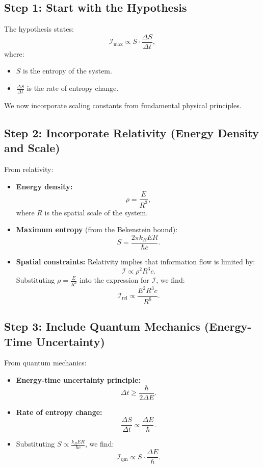 \documentclass[12pt]{article}
\begin{document}
\subsection{Step 1: Start with the Hypothesis}

The hypothesis states:
\[
\mathcal{I}_{\text{max}} \propto S \cdot \frac{\Delta S}{\Delta t},
\]
where:
\begin{itemize}
    \item $S$ is the entropy of the system.
    \item $\frac{\Delta S}{\Delta t}$ is the rate of entropy change.
\end{itemize}

We now incorporate scaling constants from fundamental physical principles.

\subsection{Step 2: Incorporate Relativity (Energy Density and Scale)}

From relativity:
\begin{itemize}
    \item \textbf{Energy density:}
    \[
    \rho = \frac{E}{R^3},
    \]
    where $R$ is the spatial scale of the system.

    \item \textbf{Maximum entropy} (from the Bekenstein bound):
    \[
    S = \frac{2 \pi k_B E R}{\hbar c}.
    \]

    \item \textbf{Spatial constraints:}
    Relativity implies that information flow is limited by:
    \[
    \mathcal{I} \propto \rho^2 R^3 c.
    \]
    Substituting $\rho = \frac{E}{R^3}$ into the expression for $\mathcal{I}$, we find:
    \[
    \mathcal{I}_{\text{rel}} \propto \frac{E^2 R^3 c}{R^6}.
    \]
\end{itemize}

\subsection{Step 3: Include Quantum Mechanics (Energy-Time Uncertainty)}

From quantum mechanics:
\begin{itemize}
    \item \textbf{Energy-time uncertainty principle:}
    \[
    \Delta t \geq \frac{\hbar}{2 \Delta E}.
    \]

    \item \textbf{Rate of entropy change:}
    \[
    \frac{\Delta S}{\Delta t} \propto \frac{\Delta E}{\hbar}.
    \]

    \item Substituting $S \propto \frac{k_B E R}{\hbar c}$, we find:
    \[
    \mathcal{I}_{\text{qm}} \propto S \cdot \frac{\Delta E}{\hbar}.
    \]
\end{itemize}
\end{document}
